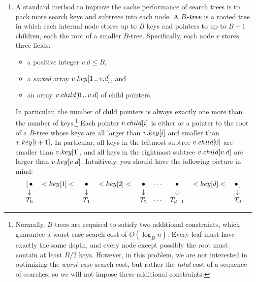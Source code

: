 \begin{enumerate}[label=\arabic*.,ref=\thechapter.\arabic*,leftmargin=*,align=left,widest*=99,itemsep=1.5ex plus 0.5ex,resume]
\begin{itemize}
\end{itemize}
Design and analyze an algorithm to compute a binary search tree over the bins that minimizes the total time the robot spends searching for books.
Your input is an array $f[1\,..\,n]$ of integers, where $f[i]$ is the number of times that the robot will be asked to retrieve a book from the $i$th bin, along with the time parameters $\alpha$, $\beta$, and $\gamma$.
\item {} A standard method to improve the cache performance of search trees is to pack more search keys and subtrees into each node.
A $B$\textbf{\textit{-tree}} is a rooted tree in which each internal node stores up to $B$ keys and pointers to up to $B+1$ children, each the root of a smaller $B$-tree.
Specifically, each node $v$ stores three fields:
\begin{itemize}
\item a positive integer $v.d\le B$,
\item a \textit{sorted} array $v.key[1\,..\,v.d]$, and
\item an array $v.child[0\,..\,v.d]$ of child pointers.
\end{itemize}
In particular, the number of child pointers is always exactly one more than the number of keys.\footnote{Normally, $B$-trees are required to satisfy two additional constraints, which guarantee a worst-case search cost of $O(\log_B n)$: Every leaf must have exactly the same depth, and every node except possibly the root must contain at least $B/2$ keys. However, in this problem, we are not interested in optimizing the \textit{worst-case} search cost, but rather the \textit{total} cost of a sequence of searches, so we will not impose these additional constraints.}
Each pointer $v.child[i]$ is either  or a pointer to the root of a $B$-tree whose keys are all larger than $v.key[i]$ and smaller than $v.key[i+1]$.
In particular, all keys in the leftmost subtree $v.child[0]$ are smaller than $v.key[1]$, and all keys in the rightmost subtree $v.child[v.d]$ are larger than $v.key[v.d]$.
Intuitively, you should have the following picture in mind:
\[
\begin{array}{ccccccccc}
[\,\bullet & {} < key[1] < {} & \bullet & {} < key[2] < {} & \bullet & \cdots & \bullet & {} < key[d] < {} & \bullet\,]\\
\downarrow & & \downarrow & & \downarrow & & \downarrow & & \downarrow\\
T_0 & & T_1 & & T_2 & \cdots & T_{d-1} & & T_d

\end{array}\]
\end{enumerate}
